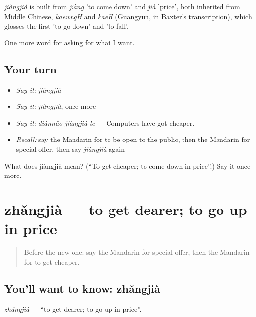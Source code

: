 \begin{cousinweb}
\emph{jiàngjià} is built from \emph{jiàng} 'to come down' and \emph{jià} 'price', both inherited from Middle Chinese, \emph{kaewngH} and \emph{kaeH} (Guangyun, in Baxter's transcription), which glosses the first 'to go down' and 'to fall'.
\end{cousinweb}

\begin{grammarlens}[title={What you've built}]
One more word for asking for what I want.
\end{grammarlens}

\subsection*{Your turn}
\begin{itemize}
\raggedright
  \item \emph{Say it:} \emph{jiàngjià}
  \item \emph{Say it:} \emph{jiàngjià}, once more
  \item \emph{Say it:} \emph{diànnǎo jiàngjià le} — Computers have got cheaper.
  \item \emph{Recall:} say the Mandarin for to be open to the public, then the Mandarin for special offer, then say \emph{jiàngjià} again
\end{itemize}

\begin{tcolorbox}[breakable,colback=teal!4,colframe=teal!35!black,title={Before you move on}]
What does jiàngjià mean? (\textquotedblleft{}To get cheaper; to come down in price\textquotedblright{}.) Say it once more.
\end{tcolorbox}
\section[zhǎngjià]{zhǎngjià — to get dearer; to go up in price}

\label{lesson:ZH-C193-zhangjia}



\begin{quote}
Before the new one: say the Mandarin for special offer, then the Mandarin for to get cheaper.
\end{quote}

\subsection*{You'll want to know: zhǎngjià}
\emph{zhǎngjià} — \textquotedblleft{}to get dearer; to go up in price\textquotedblright{}.

